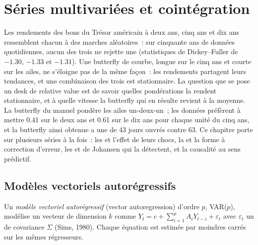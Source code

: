 \chapter{Séries multivariées et cointégration}\label{ch:qm:multivariate-series-and-cointegration}

Les rendements des bons du Trésor américain à deux ans, cinq ans et dix ans ressemblent chacun à des marches aléatoires~: sur cinquante ans de données quotidiennes, aucun des trois ne rejette
une  (statistiques de Dickey--Fuller de $-1.30$, $-1.33$ et $-1.31$). Une butterfly de courbe, longue sur le cinq ans et courte sur les ailes, ne
s'éloigne pas de la même façon~: les rendements partagent leurs tendances, et une combinaison des trois est stationnaire. La question que se pose un
desk de relative value est de savoir quelles pondérations la rendent stationnaire, et à quelle vitesse la butterfly qui en résulte revient à la moyenne. La butterfly du manuel pondère les ailes un-deux-un~; les données préfèrent
à mettre 0.41 sur le deux ans et 0.61 sur le dix ans pour chaque unité du cinq ans, et la butterfly ainsi obtenue a une  de 43 jours ouvrés contre 63.
Ce chapitre porte sur plusieurs séries à la fois~: les  et l'effet de leurs chocs, la  et la forme à
correction d'erreur, les  et de Johansen qui la détectent, et la causalité au sens prédictif.

\section{Modèles vectoriels autorégressifs}

\begin{definition}\label{def:qm:multivariate-series-and-cointegration:var}
Un \emph{modèle vectoriel autorégressif} (vector autoregression) d'ordre $p$, VAR($p$), modélise un vecteur de dimension $k$ comme $Y_t = c + \sum_{i=1}^pA_iY_{t-i} + \varepsilon_t$ avec
$\varepsilon_t$ un  de covariance $\Sigma$ (Sims, 1980). Chaque équation est estimée par moindres carrés sur les mêmes régresseurs.
\end{definition}

